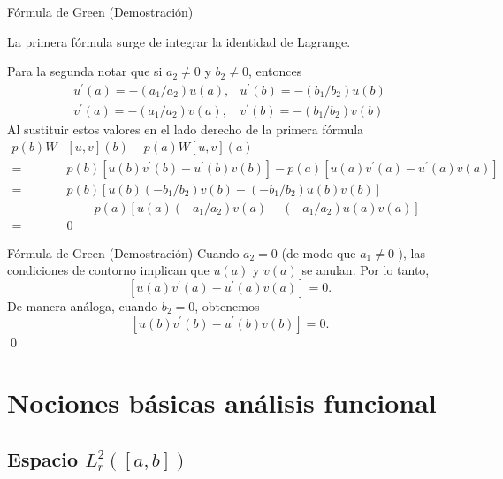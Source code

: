 \documentclass[xcolor=dvipsnames,a4paper,10pt,handout]{beamer}
\begin{document}
\begin{frame}{Fórmula de Green (Demostración)}

La primera fórmula surge de integrar la identidad de Lagrange.

Para la segunda notar que si $a_{2} \neq 0$ y $b_{2} \neq 0$, entonces
$$
\begin{array}{ll}
u^{\prime}(a)=-\left(a_{1} / a_{2}\right) u(a), & u^{\prime}(b)=-\left(b_{1} / b_{2}\right) u(b) \\
v^{\prime}(a)=-\left(a_{1} / a_{2}\right) v(a), & v^{\prime}(b)=-\left(b_{1} / b_{2}\right) v(b)
\end{array}
$$
Al sustituir estos valores en el lado derecho de la primera fórmula
$$
\begin{aligned}
p(b) W & {[u, v](b)-p(a) W[u, v](a) } \\
=& p(b)\left[u(b) v^{\prime}(b)-u^{\prime}(b) v(b)\right]-p(a)\left[u(a) v^{\prime}(a)-u^{\prime}(a) v(a)\right] \\
=& p(b)\left[u(b)\left(-b_{1} / b_{2}\right) v(b)-\left(-b_{1} / b_{2}\right) u(b) v(b)\right] \\
& \quad-p(a)\left[u(a)\left(-a_{1} / a_{2}\right) v(a)-\left(-a_{1} / a_{2}\right) u(a) v(a)\right] \\
=& 0
\end{aligned}
$$

\end{frame}


 



\begin{frame}{Fórmula de Green (Demostración)}
 Cuando $a_{2}=0$ (de modo que $a_{1} \neq 0$ ), las condiciones de contorno implican que $u(a)$ y $v(a)$ se anulan. Por lo tanto, 
 $$\left[u(a) v^{\prime}(a)-u^{\prime}(a) v(a)\right]=0.$$
 De manera análoga, cuando $b_{2}=0$, obtenemos 
 $$\left[u(b) v^{\prime}(b)-u^{\prime}(b) v(b)\right]=0.$$\qed
\end{frame}




\section{Nociones básicas análisis funcional}
\subsection{Espacio $L^2_r([a,b])$}
\end{document}
